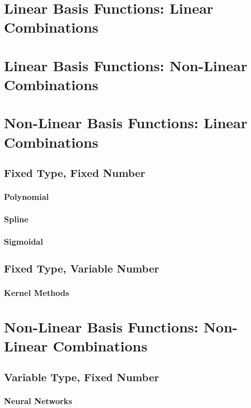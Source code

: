\documentclass{book}
\begin{document}
\section{Linear Basis Functions: Linear Combinations}

\section{Linear Basis Functions: Non-Linear Combinations}


\section{Non-Linear Basis Functions: Linear Combinations}

\subsection{Fixed Type, Fixed Number} 
\subsubsection{Polynomial}
\subsubsection{Spline}
\subsubsection{Sigmoidal}

\subsection{Fixed Type, Variable Number}
\subsubsection{Kernel Methods}

\section{Non-Linear Basis Functions: Non-Linear Combinations}
\subsection{Variable Type, Fixed Number} 
\subsubsection{Neural Networks}
\end{document}
